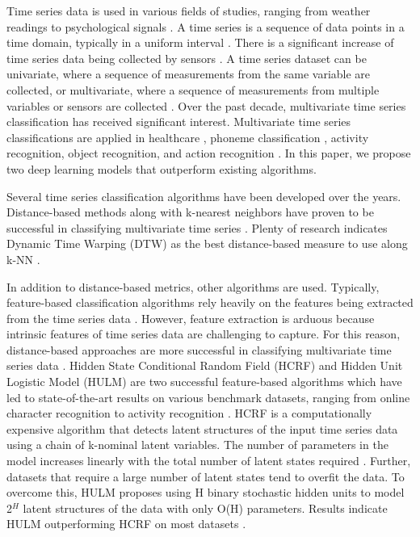 \documentclass[preprint,12pt,3p]{elsarticle}
\begin{document}
Time series data is used in various fields of studies, ranging from weather readings to psychological signals \cite{kadous2002temporal,sharabiani2017efficient,kehagias1997predictive, cui2015complex}. A time series is a sequence of data points in a time domain, typically in a uniform interval \cite{wang2016effective}. There is a significant increase of time series data being collected by sensors \cite{spiegel2011pattern}. A time series dataset can be univariate, where a sequence of measurements from the same variable are collected, or multivariate, where a sequence of measurements from multiple variables or sensors are collected \cite{prieto2015stacking}. Over the past decade, multivariate time series classification has received significant interest. Multivariate time series classifications are applied in healthcare \cite{kang2014bayesian}, phoneme classification \cite{graves2005framewise}, activity recognition, object recognition, and action recognition \cite{fu2015human,geurts2001pattern,pavlovic1999time, yu2015real}. In this paper, we propose two deep learning models that outperform existing algorithms.

Several time series classification algorithms have been developed over the years. Distance-based methods along with k-nearest neighbors have proven to be successful in classifying multivariate time series \cite{orsenigo2010combining}. Plenty of research indicates Dynamic Time Warping (DTW) as the best distance-based measure to use along k-NN \cite{seto2015multivariate}. 

In addition to distance-based metrics, other  algorithms are used. Typically, feature-based classification algorithms rely heavily on the features being extracted from the time series data \cite{xing2010brief}. However, feature extraction is arduous because intrinsic features of time series data are challenging to capture. For this reason, distance-based approaches are more successful in classifying multivariate time series data \cite{zheng2014time}.  Hidden State Conditional Random Field (HCRF) and Hidden Unit Logistic Model (HULM) are two successful feature-based algorithms which have led to state-of-the-art results on various benchmark datasets, ranging from online character recognition to activity recognition \cite{pei2017multivariate}. HCRF is a computationally expensive algorithm that detects latent structures of the input time series data using a chain of k-nominal latent variables. The number of parameters in the model increases linearly with the total number of latent states required \cite{quattoni2007hidden}. Further, datasets that require a large number of latent states tend to overfit the data. To overcome this, HULM proposes using H binary stochastic hidden units to model 2$^H$ latent structures of the data with only O(H) parameters. Results indicate HULM outperforming HCRF on most datasets \cite{pei2017multivariate}.
\end{document}
